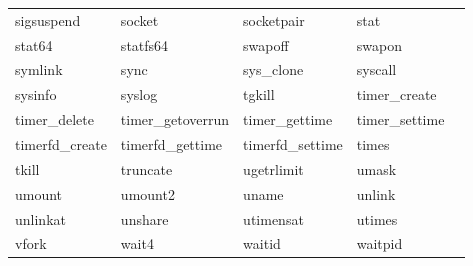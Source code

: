 \begin{center}
\begin{table}
\begin{tabular}{l p{3.5cm} p{3.5cm} p{3.5cm} p{3.5cm}|}
sigsuspend & socket & socketpair & stat \\
stat64 & statfs64 & swapoff & swapon \\
symlink & sync & sys\_clone & syscall \\
sysinfo & syslog & tgkill & timer\_create \\
timer\_delete & timer\_getoverrun & timer\_gettime & timer\_settime \\
timerfd\_create & timerfd\_gettime & timerfd\_settime & times \\
tkill & truncate & ugetrlimit & umask \\
umount & umount2 & uname & unlink \\
unlinkat & unshare & utimensat & utimes \\
vfork & wait4 & waitid & waitpid & \\
\hline
\end{tabular}

\end{table}
\end{center}